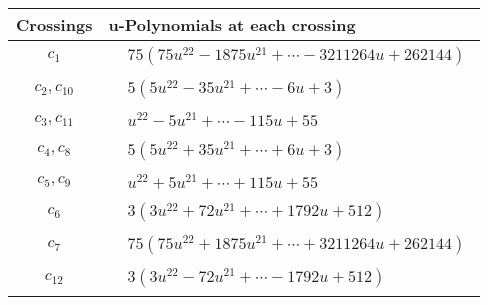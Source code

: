 \documentclass[1p]{elsarticle_modified}
\theoremstyle{definition}
\begin{document}
\begin{tabular}{m{50pt}|m{274pt}}
Crossings & \hspace{64pt}u-Polynomials at each crossing \\
\hline $$\begin{aligned}c_{1}\end{aligned}$$&$\begin{aligned}
&75(75 u^{22}-1875 u^{21}+\cdots-3211264 u+262144)
\end{aligned}$\\
\hline $$\begin{aligned}c_{2},c_{10}\end{aligned}$$&$\begin{aligned}
&5(5 u^{22}-35 u^{21}+\cdots-6 u+3)
\end{aligned}$\\
\hline $$\begin{aligned}c_{3},c_{11}\end{aligned}$$&$\begin{aligned}
&u^{22}-5 u^{21}+\cdots-115 u+55
\end{aligned}$\\
\hline $$\begin{aligned}c_{4},c_{8}\end{aligned}$$&$\begin{aligned}
&5(5 u^{22}+35 u^{21}+\cdots+6 u+3)
\end{aligned}$\\
\hline $$\begin{aligned}c_{5},c_{9}\end{aligned}$$&$\begin{aligned}
&u^{22}+5 u^{21}+\cdots+115 u+55
\end{aligned}$\\
\hline $$\begin{aligned}c_{6}\end{aligned}$$&$\begin{aligned}
&3(3 u^{22}+72 u^{21}+\cdots+1792 u+512)
\end{aligned}$\\
\hline $$\begin{aligned}c_{7}\end{aligned}$$&$\begin{aligned}
&75(75 u^{22}+1875 u^{21}+\cdots+3211264 u+262144)
\end{aligned}$\\
\hline $$\begin{aligned}c_{12}\end{aligned}$$&$\begin{aligned}
&3(3 u^{22}-72 u^{21}+\cdots-1792 u+512)
\end{aligned}$\\
\hline
\end{tabular}\\~\\
\end{document}
